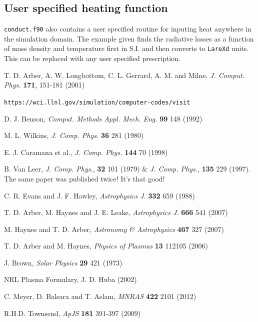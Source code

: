 \documentclass[11pt]{article}
\begin{document}
\subsection*{User specified heating function}
{\tt conduct.f90} also contains a user specified routine for inputing heat anywhere in the simulation domain. The example given finds the radiative losses as a function of mass density and temperature first in S.I. and then converts to {\tt LareXd} units. This can be replaced with any user specified prescription.


\newpage
\begin{thebibliography}{}

 T. D. Arber, A. W. Longbottom, C. L. Gerrard, A. M. and Milne. \textit{J. Comput. Phys.} \textbf{171}, 151-181 (2001)

 \texttt{https://wci.llnl.gov/simulation/computer-codes/visit}

 D. J. Benson, \textit{Comput. Methods Appl. Mech. Eng.} \textbf{99} 148 (1992)

 M. L. Wilkins, \textit{J. Comp. Phys.} \textbf{36} 281 (1980)

 E. J. Caramana et al., \textit{J. Comp. Phys.} \textbf{144} 70 (1998)

 B. Van Leer, \textit{J. Comp. Phys.}, \textbf{32} 101 (1979)  \& \textit{J. Comp. Phys.}, \textbf{135} 229 (1997). The same paper was published twice! It's that good!

 C. R. Evans and J. F. Hawley, \textit{Astrophysics J.} \textbf{332} 659 (1988)

 T. D. Arber, M. Haynes and J. E. Leake, {\it Astrophysics J.} \textbf{666} 541 (2007)

 M. Haynes and T. D. Arber, \textit{Astronomy \& Astrophysics } \textbf{467} 327 (2007)

 T. D. Arber and M. Haynes, \textit{Physics of Plasmas} \textbf{13} 112105 (2006)

 J. Brown, \textit{Solar Physics} \textbf{29} 421 (1973)

 NRL Plasma Formulary, J. D. Huba (2002)

 C. Meyer, D. Balsara and T. Aslam, \textit{MNRAS} \textbf{422} 2101 (2012)

 R.H.D. Townsend, \textit{ApJS} \textbf{181} 391-397 (2009)

\end{thebibliography}
\end{document}
